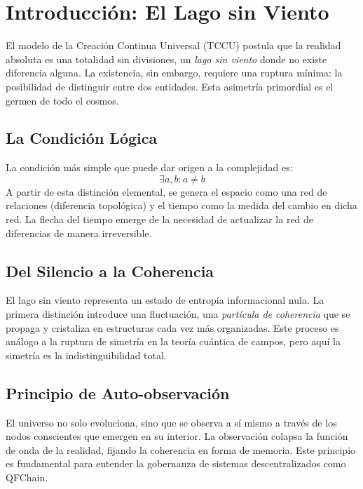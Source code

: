 \chapter{Introducción: El Lago sin Viento}
El modelo de la Creación Continua Universal (TCCU) postula que la realidad absoluta es una totalidad sin divisiones, un \emph{lago sin viento} donde no existe diferencia alguna. La existencia, sin embargo, requiere una ruptura mínima: la posibilidad de distinguir entre dos entidades. Esta asimetría primordial es el germen de todo el cosmos.

\section{La Condición Lógica}
La condición más simple que puede dar origen a la complejidad es:
\begin{equation}
\exists a, b : a \neq b \label{eq:condicion}
\end{equation}
A partir de esta distinción elemental, se genera el espacio como una red de relaciones (diferencia topológica) y el tiempo como la medida del cambio en dicha red. La flecha del tiempo emerge de la necesidad de actualizar la red de diferencias de manera irreversible.

\section{Del Silencio a la Coherencia}
El lago sin viento representa un estado de entropía informacional nula. La primera distinción introduce una fluctuación, una \emph{partícula de coherencia} que se propaga y cristaliza en estructuras cada vez más organizadas. Este proceso es análogo a la ruptura de simetría en la teoría cuántica de campos, pero aquí la simetría es la indistinguibilidad total.

\section{Principio de Auto-observación}
El universo no solo evoluciona, sino que se observa a sí mismo a través de los nodos conscientes que emergen en su interior. La observación colapsa la función de onda de la realidad, fijando la coherencia en forma de memoria. Este principio es fundamental para entender la gobernanza de sistemas descentralizados como QFChain.
